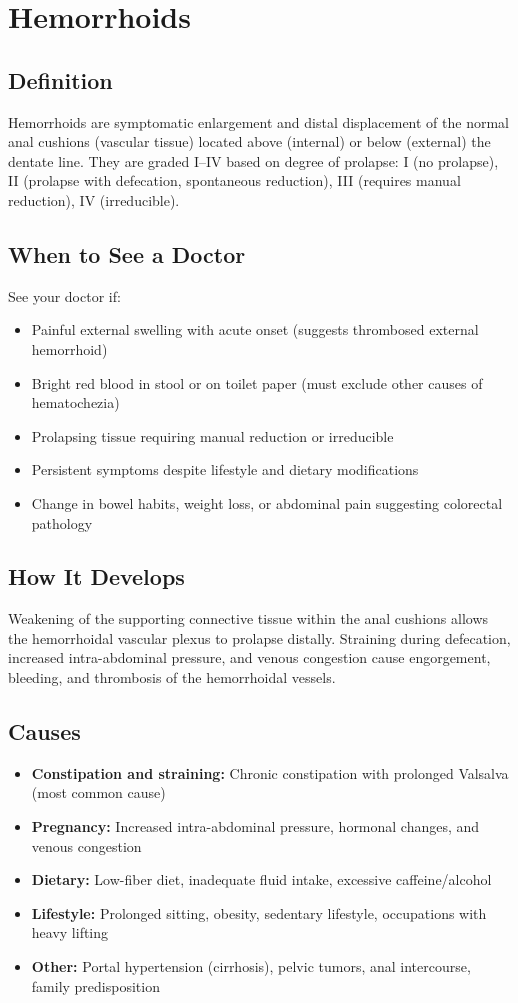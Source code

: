 \chapter{Hemorrhoids}

\section*{Definition}
Hemorrhoids are symptomatic enlargement and distal displacement of the normal anal cushions (vascular tissue) located above (internal) or below (external) the dentate line. They are graded I--IV based on degree of prolapse: I (no prolapse), II (prolapse with defecation, spontaneous reduction), III (requires manual reduction), IV (irreducible).

\section*{When to See a Doctor}
See your doctor if:
\begin{itemize}
  \item Painful external swelling with acute onset (suggests thrombosed external hemorrhoid)
  \item Bright red blood in stool or on toilet paper (must exclude other causes of hematochezia)
  \item Prolapsing tissue requiring manual reduction or irreducible
  \item Persistent symptoms despite lifestyle and dietary modifications
  \item Change in bowel habits, weight loss, or abdominal pain suggesting colorectal pathology
\end{itemize}

\section*{How It Develops}
Weakening of the supporting connective tissue within the anal cushions allows the hemorrhoidal vascular plexus to prolapse distally. Straining during defecation, increased intra-abdominal pressure, and venous congestion cause engorgement, bleeding, and thrombosis of the hemorrhoidal vessels.

\section*{Causes}
\begin{itemize}
  \item \textbf{Constipation and straining:} Chronic constipation with prolonged Valsalva (most common cause)
  \item \textbf{Pregnancy:} Increased intra-abdominal pressure, hormonal changes, and venous congestion
  \item \textbf{Dietary:} Low-fiber diet, inadequate fluid intake, excessive caffeine/alcohol
  \item \textbf{Lifestyle:} Prolonged sitting, obesity, sedentary lifestyle, occupations with heavy lifting
  \item \textbf{Other:} Portal hypertension (cirrhosis), pelvic tumors, anal intercourse, family predisposition
\end{itemize}


